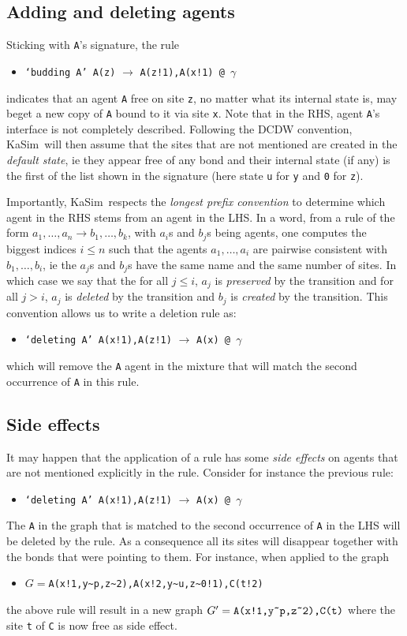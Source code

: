 \documentclass[11pt]{book}
\def\KaSim{\textsf{KaSim}}
\def\int{\hbox{\texttt{\~}}}
\def\ttt#1{\texttt{#1}}
\def\rar{\rightarrow}
\def\ga{\gamma}
\def\ie{ie }
\def\via{via }
\def\ITE#1{\begin{itemize}#1\end{itemize}}
\begin{document}
\subsection{Adding and deleting agents}
Sticking with \ttt{A}'s signature, the rule
\ITE{
\item[] \ttt{`budding A' A(z)} $\rar$ \ttt{A(z!1),A(x!1) @ $\ga$ } 
}
indicates that an agent \ttt{A} free on site \ttt{z}, no matter what its internal state is, may beget a new copy of \ttt{A} bound to it \via site \ttt{x}. Note that in the RHS, agent \ttt{A}'s interface is not completely described. Following the DCDW convention, \KaSim~will then assume that the sites that are not mentioned are created in the \emph{default state}, \ie they appear free of any bond and their internal state (if any) is the first of the list shown in the signature (here state \ttt{u} for \ttt{y} and \ttt{0} for \ttt{z}).

Importantly, \KaSim~respects the \emph{longest prefix convention} to determine which agent in the RHS stems from an agent in the LHS. 
In a word, from a rule of the form $a_1,\dots,a_n\rar b_1,\dots,b_k$, with $a_i$s and $b_j$s being agents, one computes the biggest indices $i\leq n$ such that the agents $a_1,\dots,a_i$ are pairwise consistent with $b_1,\dots,b_i$, \ie the $a_j$s and $b_j$s have the same name and the same number of sites. In which case we say that the for all $j\leq i$, $a_j$ is \emph{preserved} by the transition and for all $j>i$, $a_j$ is \emph{deleted} by the transition and $b_j$ is \emph{created} by the transition. This convention allows us to write a deletion rule as:
\ITE{
\item[] \ttt{`deleting A' A(x!1),A(z!1)} $\rar$ \ttt{A(x) @ $\ga$} 
}
which will remove the \ttt{A} agent in the mixture that will match the second occurrence of \ttt{A} in this rule.
\subsection{Side effects}

It may happen that the application of a rule has some \emph{side effects} on agents that are not mentioned explicitly in the rule. Consider for instance the previous rule:
\ITE{
\item[] \ttt{`deleting A' A(x!1),A(z!1)} $\rar$ \ttt{A(x) @ $\ga$} 
}
The \ttt{A} in the graph that is matched to the second occurrence of \ttt{A} in the LHS will be deleted by the rule. As a consequence all its sites will disappear together with the bonds that were pointing to them. For instance, when applied to the graph 
\ITE{
\item[] $G=$\ttt{A(x!1,y\int p,z\int2),A(x!2,y\int u,z\int0!1),C(t!2)}
} 
the above rule will result in a new graph $G'=\ttt{A(x!1,y\int p,z\int2),C(t)}$ where the site \ttt{t} of \ttt{C} is now free as side effect.
\end{document}
